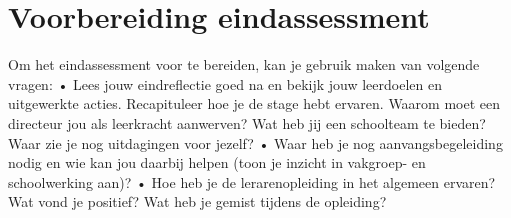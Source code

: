 \documentclass[a4paper,12pt,twoside]{article}%
\begin{document}
\section{Voorbereiding eindassessment}

Om het eindassessment voor te bereiden, kan je gebruik maken van volgende vragen:
• Lees jouw eindreflectie goed na en bekijk jouw leerdoelen en uitgewerkte acties. Recapituleer hoe je de stage hebt ervaren. Waarom moet een directeur jou als leerkracht aanwerven? Wat heb jij een schoolteam te bieden? Waar zie je nog uitdagingen voor jezelf? 
• Waar heb je nog aanvangsbegeleiding nodig en wie kan jou daarbij helpen (toon je inzicht in vakgroep- en schoolwerking aan)?
• Hoe heb je de lerarenopleiding in het algemeen ervaren? Wat vond je positief? Wat heb je gemist tijdens de opleiding? 






 
\end{document}
